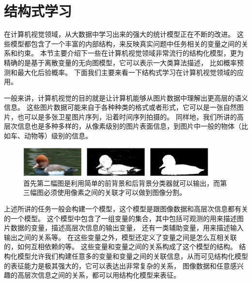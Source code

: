 \section{结构式学习}
在计算机视觉领域，从大数据中学习出来的强大的统计模型正在不断的改进。
这些模型都包含了一个丰富的内部结构，来反映真实问题中任务相关的变量之间的关系和约束。
本节主要介绍下一些在计算机视觉领域非常流行的结构化模型，更为精确的是基于离散变量的无向图模型，它可以表示一大类算法描述，
比如概率预测和最大化后验概率。
下面我们主要来看一下结构式学习在计算机视觉领域的应用。





一般来讲，计算机视觉的目的就是让计算机能够从图片数据中理解出更高层的语义信息。
这些图片数据可能来自于各种种类的格式或者形式，它可以是一张自然图片，也可以是多张卫星图片序列，沿着时间序列拍摄的。
同样地，我们所讲的高层次信息也是多种多样的，从像素级别的图片表面信息，到图片中一般的物体（比如车、动物等）级别的信息。

\begin{figure}
\centering
\includegraphics[width=0.9\textwidth]{img/struct.jpg}
\caption{首先第二幅图是利用简单的前背景和后背景分类器就可以输出，而第三幅图必须使用像素之间的关联才可以做到图像分割。}
\label{fig:struct}
\end{figure}

上述所讲的任务一般会构建一个模型，这个模型是跟图像数据和高层次信息都有关的一个模型。
这个模型中包含了一组变量的集合，其中包括可观测的用来描述图片数据的变量，描述高层次信息的输出变量，
还有一类辅助变量，用来描述输入输出之间的关系等。
在这些变量之外，模型还定义了变量之间是怎么互相关联的，如何互相依赖的等。
这些变量和变量之间的关系构成了这个模型的结构。
结构化模型允许我们构建任意多的变量和变量之间的关联信息，从而可见结构化模型的表征能力是极其强大的，它可以表达出非常复杂的关系，
图像数据和任意感兴趣的高层次信息之间的关系，都可以用结构化模型来表征。

